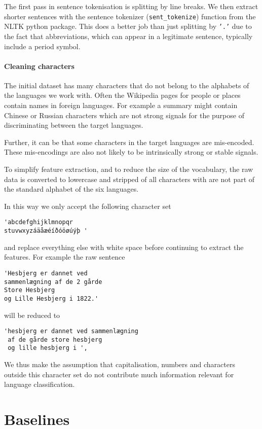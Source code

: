 \documentclass[11pt,a4paper]{article}
\begin{document}
The first pass in sentence tokenisation is splitting by line breaks.
We then extract shorter sentences with the sentence tokenizer ({\tt sent\_tokenize}) function from the NLTK\cite{nltk} python package. This does a better job than just splitting by {\tt '.'} due to the fact that abbreviations, which can appear in a legitimate sentence, typically include a period symbol.

\paragraph{Cleaning characters}
The initial dataset has many characters that do not belong to the alphabets of the languages we work with. Often the Wikipedia pages for people or places contain names in foreign languages. For example a summary might contain Chinese or Russian characters which are not strong signals for the purpose of discriminating between the target languages.

Further, it can be that some characters in the target languages are mis-encoded. These mis-encodings are also not likely to be intrinsically strong or stable signals.

To simplify feature extraction, and to reduce the size of the vocabulary, the raw data is converted to lowercase and stripped of all characters with are not part of the standard alphabet of the six languages.

In this way we only accept the following character set
\begin{verbatim}
'abcdefghijklmnopqr
stuvwxyzáäåæéíðóöøúýþ '
\end{verbatim}

and replace everything else with white space before continuing to extract the features.
For example the raw sentence
\begin{verbatim}
'Hesbjerg er dannet ved
sammenlægning af de 2 gårde
Store Hesbjerg
og Lille Hesbjerg i 1822.'
\end{verbatim}
will be reduced to
\begin{verbatim}
'hesbjerg er dannet ved sammenlægning
 af de gårde store hesbjerg
 og lille hesbjerg i ',
\end{verbatim}
We thus make the assumption that capitalisation, numbers and characters outside this character set do not contribute much information relevant for language classification.
 \section{Baselines}
\end{document}
